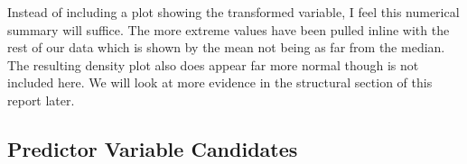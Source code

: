 

Instead of including a plot showing the transformed variable, I feel this numerical summary will suffice. The more extreme values have been pulled inline with the rest of our data which is shown by the mean not being as far from the median. The resulting density plot also does appear far more normal though is not included here. We will look at more evidence in the structural section of this report later. 

\subsection*{Predictor Variable Candidates}



